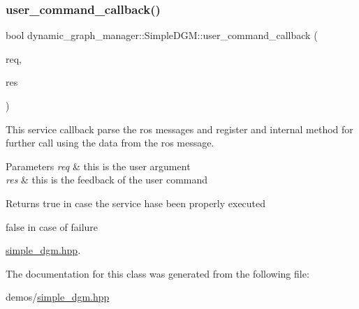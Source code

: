 \subsubsection{\texorpdfstring{user\+\_\+command\+\_\+callback()}{user\_command\_callback()}}
{\footnotesize\ttfamily bool dynamic\+\_\+graph\+\_\+manager\+::\+Simple\+D\+G\+M\+::user\+\_\+command\+\_\+callback (\begin{DoxyParamCaption}\item[{dynamic\+\_\+graph\+\_\+manager\+::\+Test\+User\+Cmd\+Bool\+::\+Request \&}]{req,  }\item[{dynamic\+\_\+graph\+\_\+manager\+::\+Test\+User\+Cmd\+Bool\+::\+Response \&}]{res }\end{DoxyParamCaption})\hspace{0.3cm}{\ttfamily [inline]}}



This service callback parse the ros messages and register and internal method for further call using the data from the ros message. 


\begin{DoxyParams}{Parameters}
{\em req} & this is the user argument \\
\hline
{\em res} & this is the feedback of the user command \\
\hline
\end{DoxyParams}
\begin{DoxyReturn}{Returns}
true in case the service hase been properly executed 

false in case of failure 
\end{DoxyReturn}
\begin{Desc}
\item[Examples\+: ]\par
\hyperlink{simple_dgm_8hpp-example}{simple\+\_\+dgm.\+hpp}.\end{Desc}


The documentation for this class was generated from the following file\+:\begin{DoxyCompactItemize}
\item 
demos/\hyperlink{simple__dgm_8hpp}{simple\+\_\+dgm.\+hpp}\end{DoxyCompactItemize}
